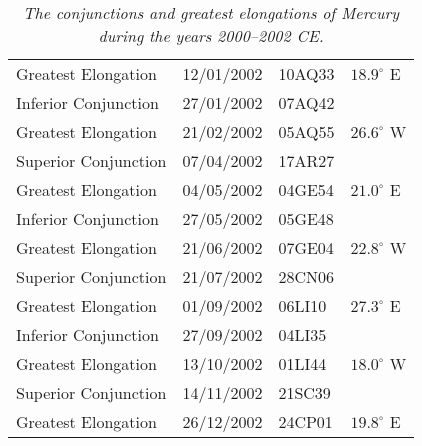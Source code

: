 \begin{table}
{\begin{tabular}{lcll}
Greatest Elongation & 12/01/2002 & 10AQ33 & $18.9^\circ$ E\\
Inferior Conjunction & 27/01/2002 & 07AQ42&\\
Greatest Elongation & 21/02/2002 & 05AQ55 & $26.6^\circ$ W\\
Superior Conjunction & 07/04/2002 & 17AR27&\\
Greatest Elongation & 04/05/2002 & 04GE54 & $21.0^\circ$ E\\
Inferior Conjunction & 27/05/2002 & 05GE48&\\
Greatest Elongation & 21/06/2002 & 07GE04 & $22.8^\circ$ W\\
Superior Conjunction & 21/07/2002 & 28CN06&\\
Greatest Elongation & 01/09/2002 & 06LI10 & $27.3^\circ$ E\\
Inferior Conjunction & 27/09/2002 & 04LI35&\\
Greatest Elongation & 13/10/2002 & 01LI44 & $18.0^\circ$ W\\
Superior Conjunction & 14/11/2002 & 21SC39&\\
Greatest Elongation & 26/12/2002 & 24CP01 & $19.8^\circ$ E\\
\end{tabular}}
\caption{\em The conjunctions and greatest elongations of Mercury
during the years 2000--2002 CE.}\label{vtmercury}
\end{table}
